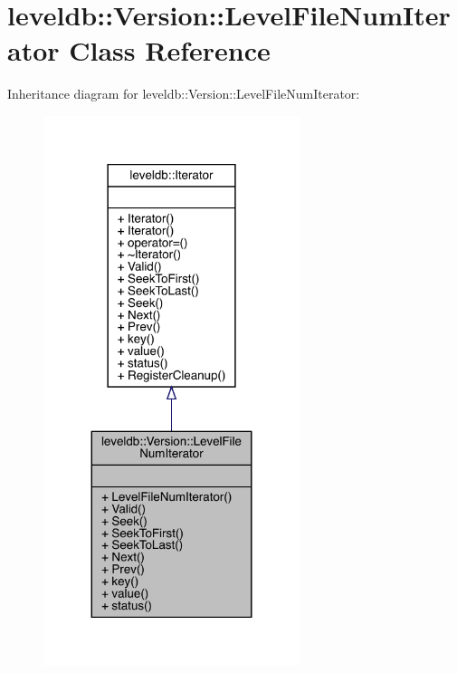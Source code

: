 \hypertarget{classleveldb_1_1_version_1_1_level_file_num_iterator}{}\section{leveldb\+::Version\+::Level\+File\+Num\+Iterator Class Reference}
\label{classleveldb_1_1_version_1_1_level_file_num_iterator}


Inheritance diagram for leveldb\+::Version\+::Level\+File\+Num\+Iterator\+:
\nopagebreak
\begin{figure}[H]
\begin{center}
\leavevmode
\includegraphics[width=212pt]{classleveldb_1_1_version_1_1_level_file_num_iterator__inherit__graph}
\end{center}
\end{figure}


